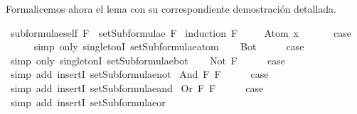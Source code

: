 \begin{isabellebody}
\begin{isamarkuptext}
  Formalicemos ahora el lema con su correspondiente demostración 
  detallada.%
\end{isamarkuptext}\isamarkuptrue%
\isamarkupfalse%
\ subformulae{\isacharunderscore}self{\isacharcolon}\ {\isachardoublequoteopen}F\ {\isasymin}\ setSubformulae\ F{\isachardoublequoteclose}\isanewline
%
\isadelimproof
%
\endisadelimproof
%
\isatagproof
{}\isamarkupfalse%
\ {\isacharparenleft}induction\ F{\isacharparenright}\ \isanewline
\ \ \isamarkupfalse%
\ {\isacharparenleft}Atom\ x{\isacharparenright}\ \isanewline
\ \ \isamarkupfalse%
\ \isamarkupfalse%
\ {\isacharquery}case\ \isanewline
\ \ \ \ \isamarkupfalse%
\ {\isacharparenleft}simp\ only{\isacharcolon}\ singletonI\ setSubformulae{\isacharunderscore}atom{\isacharparenright}\isanewline
{}\isamarkupfalse%
\isanewline
\ \ \isamarkupfalse%
\ Bot\isanewline
\ \ \isamarkupfalse%
\ \isamarkupfalse%
\ {\isacharquery}case\ \isanewline
\ \ \ \ \isamarkupfalse%
\ {\isacharparenleft}simp\ only{\isacharcolon}\ singletonI\ setSubformulae{\isacharunderscore}bot{\isacharparenright}\isanewline
{}\isamarkupfalse%
\isanewline
\ \ \isamarkupfalse%
\ {\isacharparenleft}Not\ F{\isacharparenright}\isanewline
\ \ \isamarkupfalse%
\ \isamarkupfalse%
\ {\isacharquery}case\ \isanewline
\ \ \ \ \isamarkupfalse%
\ {\isacharparenleft}simp\ add{\isacharcolon}\ insertI{}\ setSubformulae{\isacharunderscore}not{\isacharparenright}\isanewline
{}\isamarkupfalse%
\isanewline
{}\isamarkupfalse%
\ {\isacharparenleft}And\ F{}\ F{}{\isacharparenright}\isanewline
\ \ \isamarkupfalse%
\ \isamarkupfalse%
\ {\isacharquery}case\ \isanewline
\ \ \ \ \isamarkupfalse%
\ {\isacharparenleft}simp\ add{\isacharcolon}\ insertI{}\ setSubformulae{\isacharunderscore}and{\isacharparenright}\isanewline
{}\isamarkupfalse%
\isanewline
{}\isamarkupfalse%
\ {\isacharparenleft}Or\ F{}\ F{}{\isacharparenright}\isanewline
\ \ \isamarkupfalse%
\ \isamarkupfalse%
\ {\isacharquery}case\ \isanewline
\ \ \ \ \isamarkupfalse%
\ {\isacharparenleft}simp\ add{\isacharcolon}\ insertI{}\ setSubformulae{\isacharunderscore}or{\isacharparenright}\isanewline
{}\isamarkupfalse%

\end{isabellebody}
